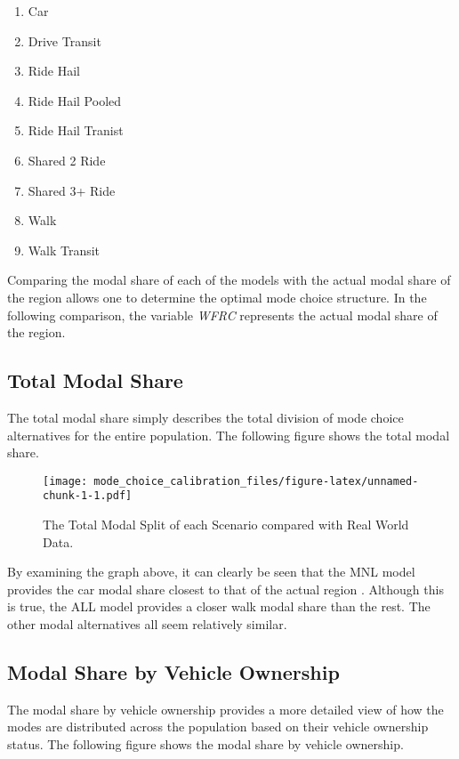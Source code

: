 \documentclass[3p, authoryear]{elsarticle} %
\providecommand{\tightlist}{%
  \setlength{\itemsep}{0pt}\setlength{\parskip}{0pt}}
\begin{document}
\begin{enumerate}
\def\labelenumi{\arabic{enumi}.}
\tightlist
\item
  Car
\item
  Drive Transit
\item
  Ride Hail
\item
  Ride Hail Pooled
\item
  Ride Hail Tranist
\item
  Shared 2 Ride
\item
  Shared 3+ Ride
\item
  Walk
\item
  Walk Transit
\end{enumerate}

Comparing the modal share of each of the models with the actual modal share of the region allows one to determine the optimal mode choice structure. In the following comparison, the variable \emph{WFRC} represents the actual modal share of the region.

\hypertarget{total-modal-share}{%
\subsection{Total Modal Share}\label{total-modal-share}}

The total modal share simply describes the total division of mode choice alternatives for the entire population. The following figure shows the total modal share.

\begin{figure}
\centering
\texttt{[image: mode\_choice\_calibration\_files/figure-latex/unnamed-chunk-1-1.pdf]}
\caption{\label{fig:unnamed-chunk-1}The Total Modal Split of each Scenario compared with Real World Data.}
\end{figure}

By examining the graph above, it can clearly be seen that the MNL model provides the car modal share closest to that of the actual region . Although this is true, the ALL model provides a closer walk modal share than the rest. The other modal alternatives all seem relatively similar.

\hypertarget{modal-share-by-vehicle-ownership}{%
\subsection{Modal Share by Vehicle Ownership}\label{modal-share-by-vehicle-ownership}}

The modal share by vehicle ownership provides a more detailed view of how the modes are distributed across the population based on their vehicle ownership status. The following figure shows the modal share by vehicle ownership.
\end{document}
